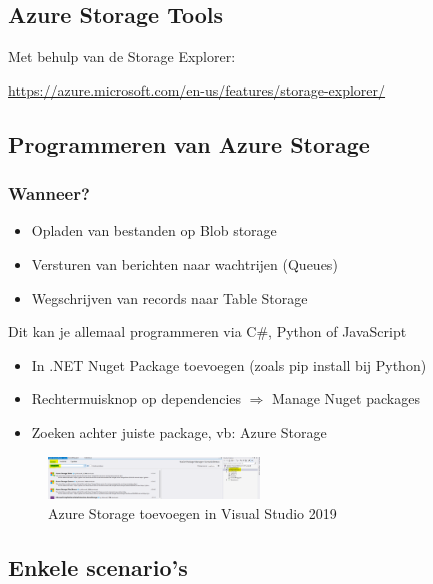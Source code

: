 \documentclass{article}
\begin{document}
\subsection{Azure Storage Tools}

Met behulp van de Storage Explorer: 

\url{https://azure.microsoft.com/en-us/features/storage-explorer/}

\subsection{Programmeren van Azure Storage}

\subsubsection{Wanneer?}

\begin{itemize}
    \item Opladen van bestanden op Blob storage
    \item Versturen van berichten naar wachtrijen (Queues)
    \item Wegschrijven van records naar Table Storage
\end{itemize}

Dit kan je allemaal programmeren via C\#, Python of JavaScript

\begin{itemize}
    \item In .NET Nuget Package toevoegen (zoals pip install bij Python)
    \item Rechtermuisknop op dependencies $\Rightarrow$ Manage Nuget packages
    \item Zoeken achter juiste package, vb: Azure Storage
\end{itemize}

\begin{figure}[H]
    \centering
    \includegraphics[width=0.5\textwidth]{azure-storage-visual-studio.png}
    \caption{Azure Storage toevoegen in Visual Studio 2019}
\end{figure}

\subsection{Enkele scenario's}
\end{document}

